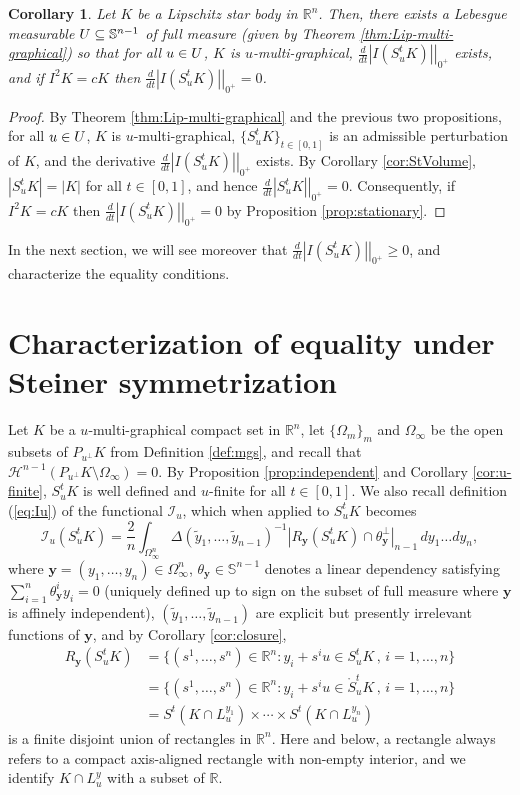 \documentclass[11pt]{article}
\newtheorem{cor}[thm]{Corollary}
\theoremstyle{definition}
\theoremstyle{proof}
\newcommand{\dt}[1]{\left . \frac{d}{dt} #1 \right |_{0^+}}
\DeclareMathOperator{\+}{\mathop{\tilde{+}}}
\newcommand{\R}{\mathbb{R}}
\renewcommand{\S}{\mathbb{S}}
\renewcommand{\H}{\mathcal{H}}
\newcommand{\I}{\mathcal{I}}
\newcommand{\y}{\mathbf{y}}
\numberwithin{equation}{section}
\numberwithin{equation}{section}
\begin{document}
\begin{cor} \label{cor:derivative-exists}
Let $K$ be a Lipschitz star body in $\R^n$. Then, there exists a Lebesgue measurable $\U \subseteq \S^{n-1}$ of full measure (given by Theorem \ref{thm:Lip-multi-graphical}) so that for all $u \in U$, $K$ is $u$-multi-graphical, $\dt{|I (S_u^t K)|}$ exists, and if $I^2 K = c K$ then $\dt{|I (S_u^t K)|}=0$.
\end{cor}
\begin{proof}
By Theorem  \ref{thm:Lip-multi-graphical} and the previous two propositions, for all $u \in U$, $K$ is $u$-multi-graphical, $\{S_u^t K\}_{t \in [0,1]}$ is an admissible perturbation of $K$, and the derivative $\dt{|I(S_u^t K)|}$ exists. By Corollary \ref{cor:StVolume}, $|S_u^t K| = |K|$ for all $t \in [0,1]$, and hence $\dt{|S_u^t K|} = 0$. Consequently, if $I^2 K = c K$ then $\dt{|I(S_u^t K)|}=0$ by Proposition \ref{prop:stationary}.
\end{proof}

In the next section, we will see moreover that $\dt{|I (S_u^t K)|} \geq 0$, and characterize the equality conditions. 

\section{Characterization of equality under Steiner symmetrization} \label{sec:equality}

Let $K$ be a $u$-multi-graphical compact set in $\R^n$, let $\{\Omega_m\}_m$ and $\Omega_\infty$ be the open subsets of $P_{u^{\perp}} K$ from Definition \ref{def:mgs}, and recall that $\H^{n-1}(P_{u^{\perp}} K \setminus \Omega_\infty) = 0$. By Proposition \ref{prop:independent} and Corollary \ref{cor:u-finite}, $S_u^t K$ is well defined and $u$-finite for all $t \in [0,1]$. We also recall definition (\ref{eq:Iu}) of the functional $\I_u$, which when applied to $S_u^t K$ becomes
\begin{equation} \label{eq:Iu-again}
\I_u(S_u^t K) = \frac{2}{n}\int_{\Omega_\infty^n} \Delta(\tilde y_1,\ldots,\tilde y_{n-1})^{-1} |R_\y(S_u^t K) \cap \theta_\y^{\perp}|_{n-1} \, dy_1 \ldots dy_n ,
\end{equation}
where $\y = (y_1,\ldots,y_n) \in \Omega_\infty^n$, $\theta_\y \in \S^{n-1}$ denotes a linear dependency satisfying $\sum_{i=1}^n \theta_\y^i y_i = 0$ (uniquely defined up to sign on the subset of full measure where $\y$ is affinely independent), $(\tilde y_1,\ldots,\tilde y_{n-1})$ are explicit but presently irrelevant functions of $\y$,
and by Corollary \ref{cor:closure},
\begin{align*}
R_\y(S_u^t K) &= \{ (s^1,\ldots,s^n)  \in \R^n :  y_i + s^i u \in S_u^t K \, , \, i=1,\ldots,n\} \\
&= \{ (s^1,\ldots,s^n)  \in \R^n : y_i + s^i u \in \mathring S_u^t K \, , \, i=1,\ldots,n\}\\
& =  S^t (K \cap L_u^{y_1}) \times \cdots \times S^t (K \cap L_u^{y_n}) 
\end{align*}
is a finite disjoint union of rectangles in $\R^n$. Here and below, a rectangle always refers to a compact axis-aligned rectangle with non-empty interior,
and we identify $K \cap L_u^y$ with a subset of $\R$. 
\end{document}
